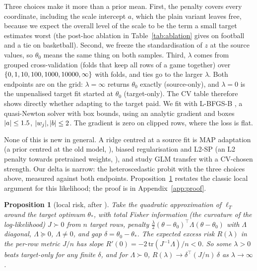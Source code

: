 \documentclass{article}
\newtheorem{proposition}{Proposition}
\begin{document}
Three choices make it more than a prior mean.
First, the penalty covers every coordinate, including the scale intercept $a$, which the plain variant leaves free, because we expect the overall level of the scale to be the term a small target estimates worst (the post-hoc ablation in Table~\ref{tab:ablation} gives \nFbFullDiffFreeA{} on football and a tie on basketball).
Second, we freeze the standardisation of $z$ at the source values, so $\theta_0$ means the same thing on both samples.
Third, $\lambda$ comes from grouped cross-validation (folds that keep all rows of a game together) over
$\{0, 1, 10, 100, 1000, 10000, \infty\}$ with \nCvFolds{} folds, and ties go to the larger $\lambda$.
Both endpoints are on the grid: $\lambda = \infty$ returns $\theta_0$ exactly (source-only), and $\lambda = 0$ is the unpenalised target fit started at $\theta_0$ (target-only).
The CV table therefore shows directly whether adapting to the target paid.
We fit with L-BFGS-B \citep{byrd1995lbfgsb}, a quasi-Newton solver with box bounds, using an analytic gradient and boxes $|a| \le 1.5$, $|w_j|, |b| \le 2$.
The gradient is zero on clipped rows, where the loss is flat.

None of this is new in general.
A ridge centred at a source fit is MAP adaptation (a prior centred at the old model, \citealp{chelba2006}), biased regularisation \citep{kuzborskij2013} and L2-SP (an L2 penalty towards pretrained weights, \citealp{li2018l2sp}), and \citet{tian2023glmtrans} study GLM transfer with a CV-chosen strength.
Our delta is narrow: the heteroscedastic probit with the three choices above, measured against both endpoints.
Proposition~\ref{prop:slope} restates the classic local argument for this likelihood; the proof is in Appendix~\ref{app:proof}.

\begin{proposition}[local risk, after \citealp{kuzborskij2013}]
\label{prop:slope}
Take the quadratic approximation of $\ell_T$ around the target optimum $\theta_*$, with total Fisher information (the curvature of the log-likelihood) $J \succ 0$ from $n$ target rows, penalty $\tfrac{\lambda}{2}(\theta-\theta_0)^\top \Lambda (\theta-\theta_0)$ with $\Lambda$ diagonal, $\Lambda \succeq 0$, $\Lambda \ne 0$, and gap $\delta = \theta_0 - \theta_*$.
The expected excess risk $R(\lambda)$ in the per-row metric $J/n$ has slope $R'(0) = -2\,\mathrm{tr}(J^{-1}\Lambda)/n < 0$.
So some $\lambda > 0$ beats target-only for any finite $\delta$, and for $\Lambda \succ 0$, $R(\lambda) \to \delta^\top (J/n)\, \delta$ as $\lambda \to \infty$.
\end{proposition}
\end{document}
